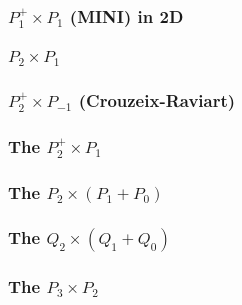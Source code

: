\textcite{nosi98}

\subsubsection{$P_1^+\times P_1$ (MINI) in 2D \label{pair:mini}}


\subsubsection{$P_2\times P_1$ \label{ss:p2p1}}


\subsubsection{$P_2^+\times P_{-1}$  (Crouzeix-Raviart) }
\label{sec:crouzeix-raviart}


\subsubsection{The $P_2^+\times P_{1}$ \label{ss:p2pp1}}


\subsubsection{The $P_2\times (P_1+P_0)$} \label{ss:p2p1p0}


\subsubsection{The $Q_2\times (Q_1+Q_0)$} \label{ss:q2q1q0}


\subsubsection{The $P_3\times P_2$} \label{ss:p3p2}


